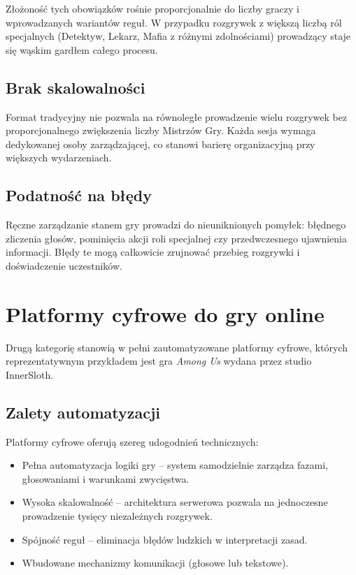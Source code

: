 ﻿\documentclass[a4paper,twoside,11pt]{mwrep}
\theoremstyle{plain} \newtheorem{thm}{Twierdzenie}
\theoremstyle{plain} \newtheorem{lem}{Lemat}
\theoremstyle{definition} \newtheorem{defn}{Definicja}
\theoremstyle{remark} \newtheorem*{rem}{Wniosek}
\begin{document}
Złożoność tych obowiązków rośnie proporcjonalnie do liczby graczy i wprowadzanych wariantów reguł. W przypadku rozgrywek z większą liczbą ról specjalnych (Detektyw, Lekarz, Mafia z różnymi zdolnościami) prowadzący staje się wąskim gardłem całego procesu.

\subsection{Brak skalowalności}

Format tradycyjny nie pozwala na równoległe prowadzenie wielu rozgrywek bez proporcjonalnego zwiększenia liczby Mistrzów Gry. Każda sesja wymaga dedykowanej osoby zarządzającej, co stanowi barierę organizacyjną przy większych wydarzeniach.

\subsection{Podatność na błędy}

Ręczne zarządzanie stanem gry prowadzi do nieuniknionych pomyłek: błędnego zliczenia głosów, pominięcia akcji roli specjalnej czy przedwczesnego ujawnienia informacji. Błędy te mogą całkowicie zrujnować przebieg rozgrywki i doświadczenie uczestników.

\section{Platformy cyfrowe do gry online}

Drugą kategorię stanowią w pełni zautomatyzowane platformy cyfrowe, których reprezentatywnym przykładem jest gra \textit{Among Us} wydana przez studio InnerSloth.

\subsection{Zalety automatyzacji}

Platformy cyfrowe oferują szereg udogodnień technicznych:
\begin{itemize}
    \item Pełna automatyzacja logiki gry -- system samodzielnie zarządza fazami, głosowaniami i warunkami zwycięstwa.
    \item Wysoka skalowalność -- architektura serwerowa pozwala na jednoczesne prowadzenie tysięcy niezależnych rozgrywek.
    \item Spójność reguł -- eliminacja błędów ludzkich w interpretacji zasad.
    \item Wbudowane mechanizmy komunikacji (głosowe lub tekstowe).
\end{itemize}
\end{document}
